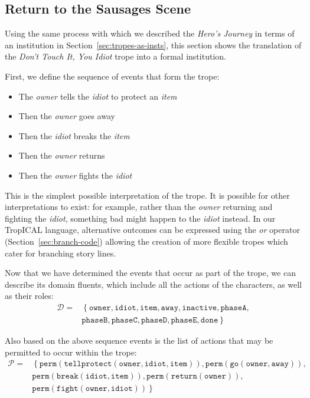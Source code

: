\documentclass[11pt]{report}
\begin{document}
\subsection{Return to the Sausages Scene}

Using the same process with which we described the \emph{Hero's Journey} in
terms of an institution in Section~\ref{sec:tropes-as-insts}, this section shows
the translation of the \emph{Don't Touch It, You Idiot} trope into a formal institution.

First, we define the sequence of events that form the trope:

\begin{itemize}
\item The \emph{owner} tells the \emph{idiot} to protect an \emph{item}
\item Then the \emph{owner} goes away
\item Then the \emph{idiot} breaks the \emph{item}
\item Then the \emph{owner} returns
\item Then the \emph{owner} fights the \emph{idiot}
\end{itemize}

This is the simplest possible interpretation of the trope. It is possible for
other interpretations to exist: for example, rather than the \emph{owner} returning and
fighting the \emph{idiot}, something bad might happen to the \emph{idiot}
instead. In our TropICAL language, alternative outcomes can be expressed using
the \emph{or} operator (Section~\ref{sec:branch-code}) allowing the creation of more flexible tropes
which cater for branching story lines.

Now that we have determined the events that occur as part of the trope, we can describe its domain fluents, which include all the
actions of the characters, as well as their roles:
\begin{align*}
  \mathcal{D} =&\left\{\mathtt{owner, idiot, item, away, inactive, phaseA,}\right.\\\nonumber
  &\left. {} \mathtt{phaseB, phaseC, phaseD, phaseE, done}\right\} %
\end{align*}

Also based on the above sequence events is the list of actions that may be
permitted to occur within the trope:
\begin{align*}
  \mathcal{P} =& \left\{\mathtt{perm(tellprotect(owner, idiot, item)), perm(go(owner, away)),}\right.\nonumber\\
  &\left. {} \mathtt{perm(break(idiot, item)), perm(return(owner)),}\right.\nonumber\\
             &\left. {} \mathtt{perm(fight(owner, idiot))}\right\} %
\end{align*}
\end{document}
